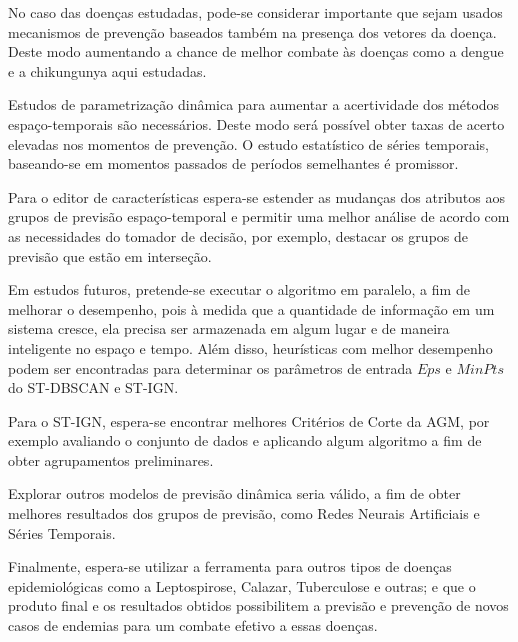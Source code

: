 No caso das doenças estudadas, pode-se considerar importante que sejam usados mecanismos de prevenção baseados também na presença dos vetores da doença. Deste modo aumentando a chance de melhor combate às doenças como a dengue e a chikungunya aqui estudadas. 

Estudos de parametrização dinâmica para aumentar a acertividade dos métodos espaço-temporais são necessários. Deste modo será possível obter taxas de acerto elevadas nos momentos de prevenção. O estudo estatístico de séries temporais, baseando-se em momentos passados de períodos semelhantes é promissor.

Para o editor de características espera-se estender as mudanças dos atributos aos grupos de previsão espaço-temporal e permitir uma melhor análise de acordo com as necessidades do tomador de decisão, por exemplo, destacar os grupos de previsão que estão em interseção.

Em estudos futuros, pretende-se executar o algoritmo em paralelo, a fim de melhorar o desempenho, pois à medida que a quantidade de informação em um sistema cresce, ela precisa ser armazenada em algum lugar e de maneira inteligente no espaço e tempo. Além disso, heurísticas com melhor desempenho podem ser encontradas para determinar os parâmetros de entrada ${Eps}$ e ${MinPts}$ do ST-DBSCAN e ST-IGN.

Para o ST-IGN, espera-se encontrar melhores Critérios de Corte da AGM, por exemplo avaliando o conjunto de dados e aplicando algum algoritmo a fim de obter agrupamentos preliminares.

Explorar outros modelos de previsão dinâmica seria válido, a fim de obter melhores resultados dos grupos de previsão, como Redes Neurais Artificiais e Séries Temporais.

Finalmente, espera-se utilizar a ferramenta para outros tipos de doenças epidemiológicas como a Leptospirose, Calazar, Tuberculose e outras; e que o produto final e os resultados obtidos possibilitem a previsão e prevenção de novos casos de endemias para um combate efetivo a essas doenças.


